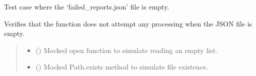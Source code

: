 \documentclass[letterpaper,10pt,english]{sphinxmanual}
\begin{document}
\begin{fulllineitems}
\label{\detokenize{test.data_storage:test.data_storage.test_retry_failed_reports.test_empty_failed_json}}
\pysigstartsignatures
\pysiglinewithargsret
{}
{\sphinxparamcomma {}}
{}
\pysigstopsignatures
\sphinxAtStartPar
Test case where the ‘failed\_reports.json’ file is empty.

\sphinxAtStartPar
Verifies that the function does not attempt any processing when the JSON file
is empty.
\begin{quote}\begin{description}
\begin{itemize}
\item {} 
\sphinxAtStartPar
{} () \textendash{} Mocked open function to simulate reading an empty list.

\item {} 
\sphinxAtStartPar
{} () \textendash{} Mocked Path.exists method to simulate file existence.

\end{itemize}

\end{description}\end{quote}

\end{fulllineitems}

\end{document}
